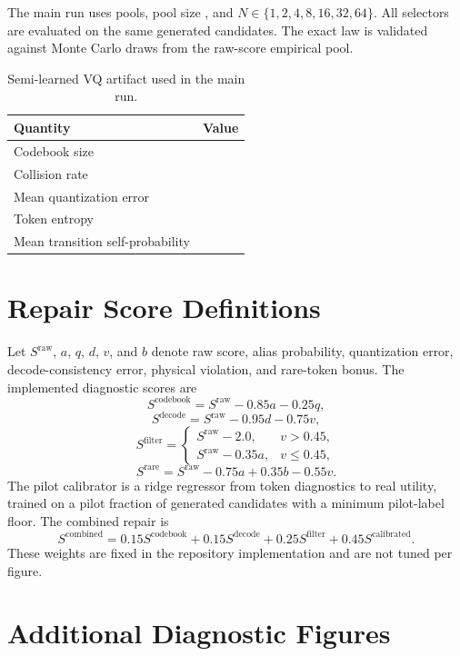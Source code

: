 The main run uses \VThreePools{} pools, pool size \VThreePoolSize{}, and $N\in\{1,2,4,8,16,32,64\}$. All selectors are evaluated on the same generated candidates. The exact law is validated against Monte Carlo draws from the raw-score empirical pool.

\begin{table}[h]
\caption{Semi-learned VQ artifact used in the main run.}
\label{tab:vq-artifact}
\centering
\small
\begin{tabular}{@{}lr@{}}
\toprule
Quantity & Value \\
\midrule
Codebook size & \VThreeVQCodebookSize{} \\
Collision rate & \VThreeVQCollision{} \\
Mean quantization error & \VThreeVQQuantError{} \\
Token entropy & \VThreeVQEntropy{} \\
Mean transition self-probability & \VThreeVQTransitionSelf{} \\
\bottomrule
\end{tabular}
\end{table}

\section{Repair Score Definitions}
\label{app:repair}

Let $S^{\mathrm{raw}}$, $a$, $q$, $d$, $v$, and $b$ denote raw score, alias probability, quantization error, decode-consistency error, physical violation, and rare-token bonus. The implemented diagnostic scores are
\[
S^{\mathrm{codebook}} = S^{\mathrm{raw}} - 0.85a - 0.25q,
\]
\[
S^{\mathrm{decode}} = S^{\mathrm{raw}} - 0.95d - 0.75v,
\]
\[
S^{\mathrm{filter}} =
\begin{cases}
S^{\mathrm{raw}} - 2.0, & v > 0.45,\\
S^{\mathrm{raw}} - 0.35a, & v \leq 0.45,
\end{cases}
\]
\[
S^{\mathrm{rare}} = S^{\mathrm{raw}} - 0.75a + 0.35b - 0.55v.
\]
The pilot calibrator is a ridge regressor from token diagnostics to real utility, trained on a pilot fraction of generated candidates with a minimum pilot-label floor. The combined repair is
\[
S^{\mathrm{combined}} =
0.15S^{\mathrm{codebook}}
+0.15S^{\mathrm{decode}}
+0.25S^{\mathrm{filter}}
+0.45S^{\mathrm{calibrated}}.
\]
These weights are fixed in the repository implementation and are not tuned per figure.

\section{Additional Diagnostic Figures}
\label{app:figures}

